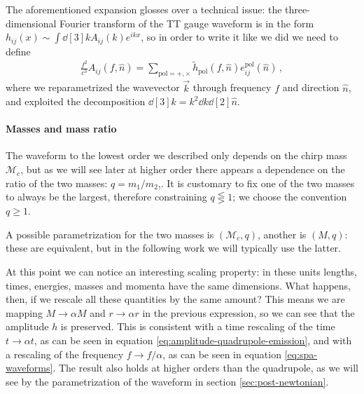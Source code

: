 \documentclass[main.tex]{subfiles}
\begin{document}
The aforementioned expansion glosses over a technical issue: the three-dimensional Fourier transform of the \ac{TT} gauge waveform is in the form \(h_{ij}(x) \sim \int \dd[3]{k} A_{ij}(k) e^{ikx}\), so in order to write it like we did we need to define 
%
\begin{align}
\frac{f^2}{c^3} A_{ij} (f, \hat{n}) = \sum _{\text{pol}= +, \times }
\widetilde{h}_{\text{pol}} (f, \hat{n}) e^{\text{pol}}_{ij}(\hat{n})
\,,
\end{align}
%
where we reparametrized the wavevector \(\vec{k}\) through frequency \(f\) and direction \(\hat{n}\), and exploited the decomposition \(\dd[3]{k} = k^2 \dd{k} \dd[2]{\hat{n}}\).

\paragraph{Masses and mass ratio}

The waveform to the lowest order we described only depends on the chirp mass \(\mathcal{M}_c\), but as we will see later at higher order there appears a dependence on the ratio of the two masses: \(q = m_1 / m_2 \),. 
It is customary to fix one of the two masses to always be the largest, therefore constraining \(q \lesseqgtr 1\); we choose the convention \(q \geq 1\).

A possible parametrization for the two masses is \((\mathcal{M}_c, q)\), another is \((M, q)\): these are equivalent, but in the following work we will typically use the latter. 


At this point we can notice an interesting scaling property: in these units lengths, times, energies, masses and momenta have the same dimensions. What happens, then, if we rescale all these quantities by the same amount?
This means we are mapping \(M \to \alpha M\) and \(r \to \alpha r\) in the previous expression, so we can see that the amplitude \(h\) is preserved. 
This is consistent with a time rescaling of the time \(t \to \alpha t \), as can be seen in equation \eqref{eq:amplitude-quadrupole-emission}, and with a rescaling of the frequency \(f \to f / \alpha \), as can be seen in equation \eqref{eq:spa-waveforms}. 
The result also holds at higher orders than the quadrupole, as we will see by the parametrization of the waveform in section \ref{sec:post-newtonian}. 


\end{document}
